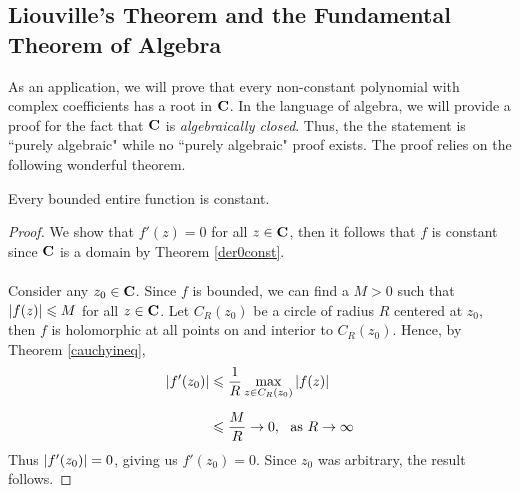 \subsection{Liouville's Theorem and the Fundamental Theorem of Algebra}
As an application, we will prove that every non-constant polynomial with complex coefficients has a root in $\mathbf C$. In the language of algebra, we will provide a proof for the fact that $\mathbf C$ is \emph{algebraically closed}. Thus, the the statement is ``purely algebraic" while no ``purely algebraic" proof exists. The proof relies on the following wonderful theorem. 

\medskip

\begin{theorem}\label{liouville}
Every bounded entire function is constant. 
\end{theorem}
\begin{proof}
We show that $f'(z) = 0$ for all $z \in \mathbf C$, then it follows that $f$ is constant since $\mathbf C$ is a domain by Theorem \ref{der0const}.\\
\\
Consider any $z_0 \in \mathbf C$. Since $f$ is bounded, we can find a $M>0$ such that $\left\lvert f(z)\right\rvert \leqslant M$ for all $z \in \mathbf C$. Let $C_R(z_0)$ be a circle of radius $R$ centered at $z_0$, then $f$ is holomorphic at all points on and interior to $C_R(z_0)$. Hence, by Theorem \ref{cauchyineq},
\begin{align*}
\left\lvert f'(z_0)\right\rvert &\leqslant \frac{1}{R}\max_{z \in C_R(z_0)}\left\lvert f(z)\right\rvert\\[0.5em]
&\leqslant \frac{M}{R} \to 0,\ \text{ as } R \to \infty
\end{align*}
Thus $\left\lvert f'(z_0)\right\rvert = 0$, giving us $f'(z_0) = 0$. Since $z_0$ was arbitrary, the result follows. 
\end{proof} 

\medskip


